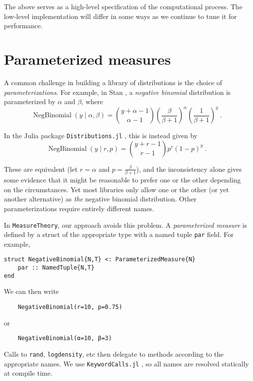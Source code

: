 \documentclass{juliacon}
\begin{document}
The above serves as a high-level specification  of the computational process. The low-level implementation will differ in some ways as we continue to tune it for performance.


\section{Parameterized measures}

A common challenge in building a library of distributions is the choice of \emph{parameterizations}. For example, in Stan \cite{Stan},
a \emph{negative binomial} distribution is parameterized by $\alpha$ and $\beta$, where
\[
\operatorname{NegBinomial}(y \mid \alpha, \beta)
=\binom{y+\alpha-1}{\alpha-1}\left(\frac{\beta}{\beta+1}\right)^{\alpha}\left(\frac{1}{\beta+1}\right)^{y}\ .
\]

In the Julia package \verb|Distributions.jl| \cite{Distributions.jl-2019}, this is instead given by
\[
\operatorname{NegBinomial}(y \mid r, p)
= \binom{y + r - 1}{r - 1} p^r (1 - p)^y \ .
\]

These are equivalent (let $r = \alpha$ and $p = \frac{\beta}{\beta + 1}$), and the inconsistency alone gives some evidence that it might be reasonable to prefer one or the other depending on the circumstances. Yet most libraries only allow one or the other (or yet another alternative) as \emph{the} negative binomial distribution. Other parameterizations require entirely different names.

In \verb|MeasureTheory|, our approach avoids this problem. A \emph{parameterized measure} is defined by a struct of the appropriate type with a named tuple \verb|par| field. For example,

\begin{verbatim}
struct NegativeBinomial{N,T} <: ParameterizedMeasure{N}
    par :: NamedTuple{N,T}
end
\end{verbatim}

We can then write 
\begin{verbatim}
    NegativeBinomial(r=10, p=0.75)
\end{verbatim}
or
\begin{verbatim}
    NegativeBinomial(α=10, β=3)
\end{verbatim}

Calls to \verb|rand|, \verb|logdensity|, etc then delegate to methods according to the appropriate names. We use \verb|KeywordCalls.jl| \cite{KeywordCalls.jl}, so all names are resolved statically at compile time.
\end{document}
